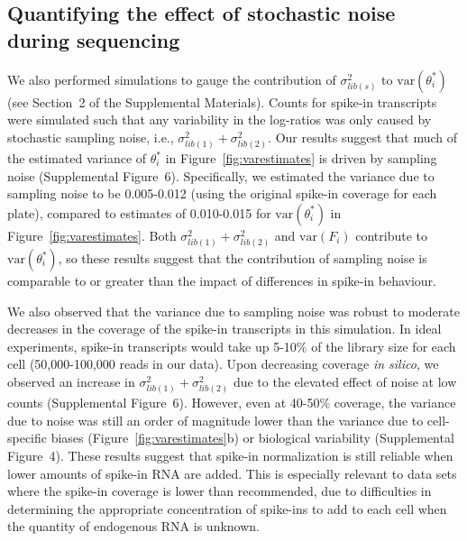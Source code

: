 \documentclass{article}
\newcommand{\suppfigcell}{4}
\newcommand{\suppfignoise}{6}
\newcommand{\suppsecnoise}{2}
\newcommand\variance{\mbox{var}}
\begin{document}
\subsection*{Quantifying the effect of stochastic noise during sequencing}
We also performed simulations to gauge the contribution of $\sigma^2_{lib(s)}$ to $\variance(\theta^*_i)$ (see Section~\suppsecnoise{} of the Supplemental Materials).
Counts for spike-in transcripts were simulated such that any variability in the log-ratios was only caused by stochastic sampling noise, i.e., $\sigma^2_{lib(1)} + \sigma^2_{lib(2)}$.
Our results suggest that much of the estimated variance of $\theta^*_i$ in Figure~\ref{fig:varestimates} is driven by sampling noise (Supplemental Figure~\suppfignoise{}).
Specifically, we estimated the variance due to sampling noise to be 0.005-0.012 (using the original spike-in coverage for each plate), compared to estimates of 0.010-0.015 for $\variance(\theta^*_i)$ in Figure~\ref{fig:varestimates}.
Both $\sigma^2_{lib(1)} + \sigma^2_{lib(2)}$ and  $\variance(F_i)$ contribute to  $\variance(\theta^*_i)$, so these results suggest that the contribution of sampling noise is comparable to or greater than the impact of differences in spike-in behaviour.

We also observed that the variance due to sampling noise was robust to moderate decreases in the coverage of the spike-in transcripts in this simulation.
In ideal experiments, spike-in transcripts would take up 5-10\% of the library size for each cell (50,000-100,000 reads in our data).
Upon decreasing coverage \textit{in silico}, we observed an increase in $\sigma^2_{lib(1)} + \sigma^2_{lib(2)}$ due to the elevated effect of noise at low counts (Supplemental Figure~\suppfignoise{}).
However, even at 40-50\% coverage, the variance due to noise was still an order of magnitude lower than the variance due to cell-specific biases (Figure~\ref{fig:varestimates}b) or biological variability (Supplemental Figure~\suppfigcell{}).
These results suggest that spike-in normalization is still reliable when lower amounts of spike-in RNA are added.
This is especially relevant to data sets where the spike-in coverage is lower than recommended, due to difficulties in determining the appropriate concentration of spike-ins to add to each cell when the quantity of endogenous RNA is unknown.
\end{document}
